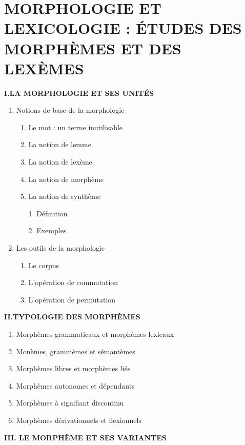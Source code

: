 \chapter{MORPHOLOGIE ET LEXICOLOGIE : ÉTUDES DES MORPHÈMES ET DES LEXÈMES}
\label{chapter-9}
\begin{keybox}
\small{}
\renewcommand{\thempfootnote}{校\arabic{editorialnote}}
\textbf{I.\quad LA MORPHOLOGIE ET SES UNITÉS}
\begin{enumerate}[label=\arabic*.]
\item Notions de base de la morphologie
\begin{enumerate}[label=\textcircled{\scriptsize\arabic*}]
\item Le mot : un terme inutilisable
\item La notion de lemme
\item La notion de lexème
\item La notion de morphème
\item La notion de synthème\par
1. Définition\par 2. Exemples
\end{enumerate}
\item Les outils de la morphologie
\begin{enumerate}[label=\textcircled{\scriptsize\arabic*}]
\item Le corpus
\item L’opération de commutation
\item L’opération de permutation
\end{enumerate}
\end{enumerate}
\textbf{II.\quad TYPOLOGIE DES MORPHÈMES}
\begin{enumerate}[label=\arabic*.]
\item Morphèmes grammaticaux et morphèmes lexicaux
\item Monèmes, grammèmes et sémantèmes
\item Morphèmes libres et morphèmes liés
\item Morphèmes autonomes et dépendants
\item Morphèmes à signifiant discontinu
\item Morphèmes dérivationnels et flexionnels
\end{enumerate}
\textbf{III. LE MORPHÈME ET SES VARIANTES}
\begin{enumerate}[label=\arabic*.]

\end{enumerate}
\end{keybox}
